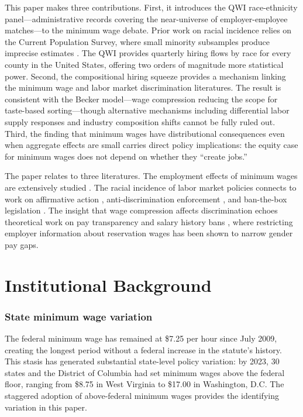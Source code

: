 \documentclass[12pt]{article}
\begin{document}
This paper makes three contributions. First, it introduces the QWI race-ethnicity panel---administrative records covering the near-universe of employer-employee matches---to the minimum wage debate. Prior work on racial incidence relies on the Current Population Survey, where small minority subsamples produce imprecise estimates \citep{cengiz2019effect, neumark2014revisiting}. The QWI provides quarterly hiring flows by race for every county in the United States, offering two orders of magnitude more statistical power. Second, the compositional hiring squeeze provides a mechanism linking the minimum wage and labor market discrimination literatures. The result is consistent with the Becker model---wage compression reducing the scope for taste-based sorting---though alternative mechanisms including differential labor supply responses and industry composition shifts cannot be fully ruled out. Third, the finding that minimum wages have distributional consequences even when aggregate effects are small carries direct policy implications: the equity case for minimum wages does not depend on whether they ``create jobs.''

The paper relates to three literatures. The employment effects of minimum wages are extensively studied \citep{card1994minimum, neumark2008minimum, cengiz2019effect, dube2010minimum, dube2019fairness, harasztosi2019pays}. The racial incidence of labor market policies connects to work on affirmative action \citep{holzer2006affirmative}, anti-discrimination enforcement \citep{kline2022systemic}, and ban-the-box legislation \citep{doleac2020unintended, agan2018ban}. The insight that wage compression affects discrimination echoes theoretical work on pay transparency \citep{cullen2024equilibrium} and salary history bans \citep{bessen2020employer, hansen2020salary}, where restricting employer information about reservation wages has been shown to narrow gender pay gaps.


\section{Institutional Background}

\subsubsection*{State minimum wage variation} The federal minimum wage has remained at \$7.25 per hour since July 2009, creating the longest period without a federal increase in the statute's history. This stasis has generated substantial state-level policy variation: by 2023, 30 states and the District of Columbia had set minimum wages above the federal floor, ranging from \$8.75 in West Virginia to \$17.00 in Washington, D.C. The staggered adoption of above-federal minimum wages provides the identifying variation in this paper.
\end{document}
